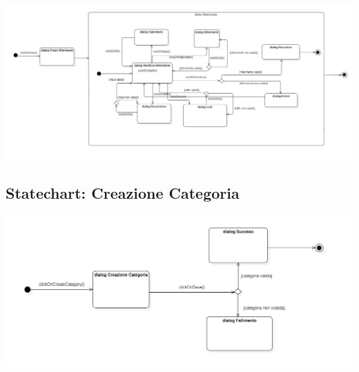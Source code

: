         \begin{center}
            \includegraphics[width=.95\textwidth]{Immagini/Alexandria/Statechart Modifica Riferimento.PNG} 
        \end{center}

\raggedright{\subsection{Statechart: Creazione Categoria}}

        \begin{center}
            \includegraphics[width=.95\textwidth]{Immagini/Alexandria/Statechart Creazione Categoria.PNG} 
        \end{center}
